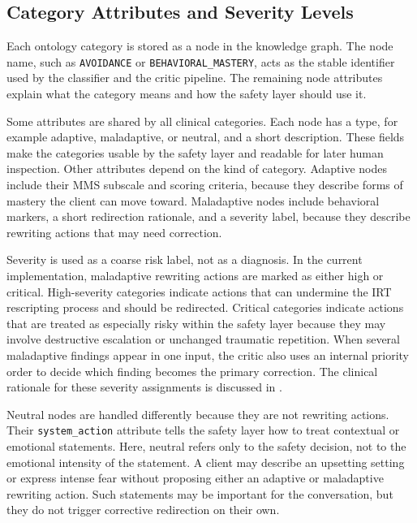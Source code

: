 \subsection{Category Attributes and Severity Levels}

Each ontology category is stored as a node in the knowledge graph. The node name, such as \texttt{AVOIDANCE} or \texttt{BEHAVIORAL\_MASTERY}, acts as the stable identifier used by the classifier and the critic pipeline. The remaining node attributes explain what the category means and how the safety layer should use it.

Some attributes are shared by all clinical categories. Each node has a type, for example adaptive, maladaptive, or neutral, and a short description. These fields make the categories usable by the safety layer and readable for later human inspection. Other attributes depend on the kind of category. Adaptive nodes include their MMS subscale and scoring criteria, because they describe forms of mastery the client can move toward. Maladaptive nodes include behavioral markers, a short redirection rationale, and a severity label, because they describe rewriting actions that may need correction.

Severity is used as a coarse risk label, not as a diagnosis. In the current implementation, maladaptive rewriting actions are marked as either high or critical. High-severity categories indicate actions that can undermine the IRT rescripting process and should be redirected. Critical categories indicate actions that are treated as especially risky within the safety layer because they may involve destructive escalation or unchanged traumatic repetition. When several maladaptive findings appear in one input, the critic also uses an internal priority order to decide which finding becomes the primary correction. The clinical rationale for these severity assignments is discussed in .

Neutral nodes are handled differently because they are not rewriting actions. Their \texttt{system\_action} attribute tells the safety layer how to treat contextual or emotional statements. Here, neutral refers only to the safety decision, not to the emotional intensity of the statement. A client may describe an upsetting setting or express intense fear without proposing either an adaptive or maladaptive rewriting action. Such statements may be important for the conversation, but they do not trigger corrective redirection on their own.

